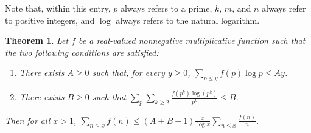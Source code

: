 \documentclass[12pt]{article}
\newtheorem*{thm*}{Theorem}
\begin{document}
Note that, within this entry, $p$ always refers to a prime, $k$, $m$, and $n$ always refer to positive integers, and $\log$ always refers to the natural logarithm.

\begin{thm*}
Let $f$ be a real-valued nonnegative multiplicative function such that the two following conditions are satisfied:

\begin{enumerate}
\item There exists $A \ge 0$ such that, for every $y \ge 0$, $\displaystyle \sum_{p \le y} f(p) \log p \le Ay$.
\item There exists $B \ge 0$ such that $\displaystyle \sum_p \sum_{k \ge 2} \frac{f(p^k)\log(p^k)}{p^k} \le B$.
\end{enumerate}

Then for all $x>1$, $\displaystyle \sum_{n \le x} f(n) \le (A+B+1) \frac{x}{\log x} \sum_{n \le x} \frac{f(n)}{n}$.
\end{thm*}
\end{document}
